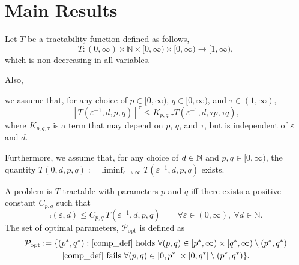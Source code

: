 \documentclass[11pt,a4paper]{article}
\begin{document}
\section{Main Results}


Let $T$ be a tractability function defined as follows,
\[
T :(0,\infty) \times \mathbb{N} \times [0,\infty) \times [0,\infty) \rightarrow [1,\infty),
\] 
which is non-decreasing in all variables.

Also, {we assume that, for any choice of $p\in[0,\infty)$, $q\in [0,\infty)$, and $\tau\in (1,\infty)$,
\[
[T(\varepsilon^{-1},d,p,q)]^\tau \le K_{p,q,\tau} T(\varepsilon^{-1},d,\tau p,\tau q),
\]
where $K_{p,q,\tau}$ is a term that may depend on $p$, $q$, and $\tau$, but is independent of $\varepsilon$ and $d$. 

Furthermore, we assume that, for any choice of $d\in\mathbb{N}$ and $p,q\in [0,\infty)$, 
the quantity $T(0,d,p,q):=\liminf_{\varepsilon\to\infty}T(\varepsilon^{-1},d,p,q)$ exists.


A problem is $T$-tractable with parameters $p$ and $q$ iff there exists a positive constant $C_{p,q}$ such that
\begin{equation} \label{comp_def}
\comp(\varepsilon,d) \le C_{p,q}\, T(\varepsilon^{-1},d,p,q) \qquad \forall \varepsilon \in (0,\infty), \ \forall d \in \mathbb{N}.
\end{equation}
The  set of optimal parameters, $\mathcal{P}_{\text{opt}}$ is defined as
\begin{multline}
    \mathcal{P}_{\text{opt}} : = \{(p^*,q^*) : \eqref{comp_def} \text{ holds }\forall (p,q) \in [p^*,\infty) \times [q^*,\infty) \setminus (p^*,q^*) \\ 
    \eqref{comp_def} \text{ fails } \forall (p,q) \in [0,p^*] \times [0,q^*] \setminus (p^*,q^*) \}.
\end{multline}




}
\end{document}
